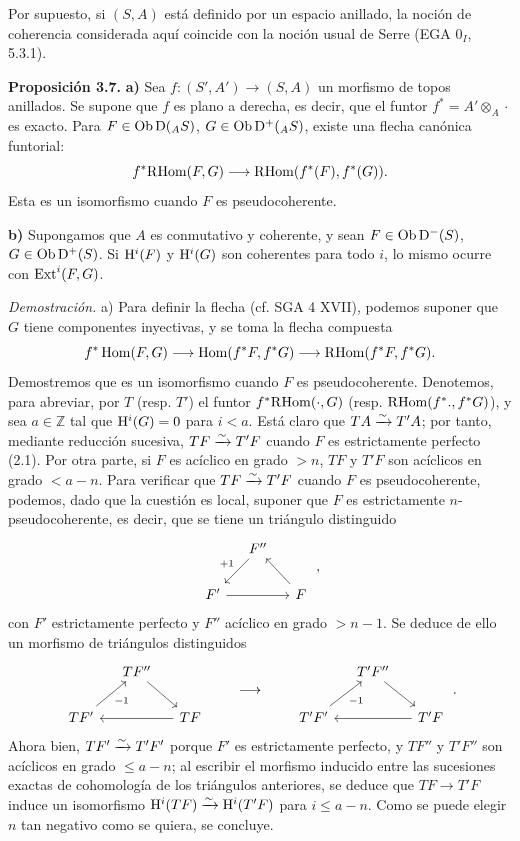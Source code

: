 Por supuesto, si \((S,A)\) está definido por un espacio anillado, la noción de coherencia considerada aquí coincide con la noción usual de Serre (EGA \(0_I\), 5.3.1).

\textbf{Proposición 3.7.} \textbf{a)} Sea \(f:(S',A')\to(S,A)\) un morfismo de topos anillados. Se supone que \(f\) es plano a derecha, es decir, que el funtor \(f^*=A'\otimes_A\cdot\) es exacto. Para \(F\in\operatorname{Ob}\mathrm D(_A S)\), \(G\in\operatorname{Ob}\mathrm D^+(_A S)\), existe una flecha canónica funtorial:
\[
  f^*\mathrm R\!\operatorname{Hom}(F,G)\longrightarrow\mathrm R\!\operatorname{Hom}(f^*(F),f^*(G)).
\]
Esta es un isomorfismo cuando \(F\) es pseudocoherente.

\textbf{b)} Supongamos que \(A\) es conmutativo y coherente, y sean \(F\in\operatorname{Ob}\mathrm D^-(S)\), \(G\in\operatorname{Ob}\mathrm D^+(S)\). Si \(\mathrm H^i(F)\) y \(\mathrm H^i(G)\) son coherentes para todo \(i\), lo mismo ocurre con \(\operatorname{Ext}^i(F,G)\).

\emph{Demostración.} a) Para definir la flecha (cf. SGA 4 XVII), podemos suponer que \(G\) tiene componentes inyectivas, y se toma la flecha compuesta
\[
  f^*\operatorname{Hom}(F,G)\longrightarrow\operatorname{Hom}(f^*F,f^*G)\longrightarrow\mathrm R\!\operatorname{Hom}(f^*F,f^*G).
\]
Demostremos que es un isomorfismo cuando \(F\) es pseudocoherente. Denotemos, para abreviar, por \(T\) (resp. \(T'\)) el funtor \(f^*\mathrm R\!\operatorname{Hom}(\cdot,G)\) (resp. \(\mathrm R\!\operatorname{Hom}(f^*.,f^*G)\)), y sea \(a\in\mathbb Z\) tal que \(\mathrm H^i(G)=0\) para \(i<a\). Está claro que \(TA\xrightarrow{\sim} T'A\); por tanto, mediante reducción sucesiva, \(TF\xrightarrow{\sim} T'F\) cuando \(F\) es estrictamente perfecto (2.1). Por otra parte, si \(F\) es acíclico en grado \(>n\), \(TF\) y \(T'F\) son acíclicos en grado \(<a-n\). Para verificar que \(TF\xrightarrow{\sim} T'F\) cuando \(F\) es pseudocoherente, podemos, dado que la cuestión es local, suponer que \(F\) es estrictamente \(n\)-pseudocoherente, es decir, que se tiene un triángulo distinguido
\[
\begin{tikzcd}[column sep=small]
& F'' \arrow[dl,"+1"'] & \\
F' \arrow[rr] & & F \arrow[ul]
\end{tikzcd}
\;,
\]
con \(F'\) estrictamente perfecto y \(F''\) acíclico en grado \(>n-1\). Se deduce de ello un morfismo de triángulos distinguidos
\[
\begin{tikzcd}[column sep=small]
& TF'' \arrow[dr] & \\
TF' \arrow[ur,"-1"'] & & TF \arrow[ll]
\end{tikzcd}
\qquad\longrightarrow\qquad
\begin{tikzcd}[column sep=small]
& T'F'' \arrow[dr] & \\
T'F' \arrow[ur,"-1"'] & & T'F \arrow[ll]
\end{tikzcd}
\;.
\]
Ahora bien, \(TF'\xrightarrow{\sim} T'F'\) porque \(F'\) es estrictamente perfecto, y \(TF''\) y \(T'F''\) son acíclicos en grado \(\leq a-n\); al escribir el morfismo inducido entre las sucesiones exactas de cohomología de los triángulos anteriores, se deduce que \(TF\to T'F\) induce un isomorfismo \(\mathrm H^i(TF)\xrightarrow{\sim}\mathrm H^i(T'F)\) para \(i\leq a-n\). Como se puede elegir \(n\) tan negativo como se quiera, se concluye.

